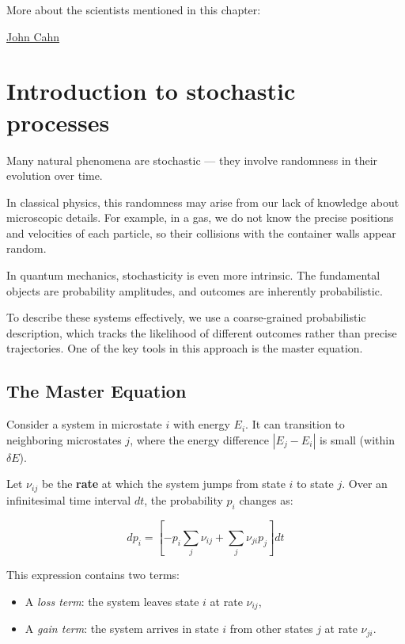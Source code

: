 \documentclass[
  letterpaper,
  enabledeprecatedfontcommands]{report}
\providecommand{\tightlist}{%
  \setlength{\itemsep}{0pt}\setlength{\parskip}{0pt}}
\begin{document}
More about the scientists mentioned in this chapter:

\href{https://en.wikipedia.org/wiki/John_W._Cahn}{John Cahn}

\chapter{Introduction to stochastic
processes}\label{introduction-to-stochastic-processes}

Many natural phenomena are stochastic --- they involve randomness in
their evolution over time.

In classical physics, this randomness may arise from our lack of
knowledge about microscopic details. For example, in a gas, we do not
know the precise positions and velocities of each particle, so their
collisions with the container walls appear random.

In quantum mechanics, stochasticity is even more intrinsic. The
fundamental objects are probability amplitudes, and outcomes are
inherently probabilistic.

To describe these systems effectively, we use a coarse-grained
probabilistic description, which tracks the likelihood of different
outcomes rather than precise trajectories. One of the key tools in this
approach is the master equation.

\section{The Master Equation}\label{the-master-equation}

Consider a system in microstate \(i\) with energy \(E_i\). It can
transition to neighboring microstates \(j\), where the energy difference
\(|E_j - E_i|\) is small (within \(\delta E\)).

Let \(\nu_{ij}\) be the \textbf{rate} at which the system jumps from
state \(i\) to state \(j\). Over an infinitesimal time interval \(dt\),
the probability \(p_i\) changes as:

\[
dp_i = \left[ -p_i \sum_j  \nu_{ij} + \sum_j \nu_{ji} p_j \right] dt
\]

This expression contains two terms:

\begin{itemize}
\tightlist
\item
  A \emph{loss term}: the system leaves state \(i\) at rate
  \(\nu_{ij}\),
\item
  A \emph{gain term}: the system arrives in state \(i\) from other
  states \(j\) at rate \(\nu_{ji}\).
\end{itemize}
\end{document}
